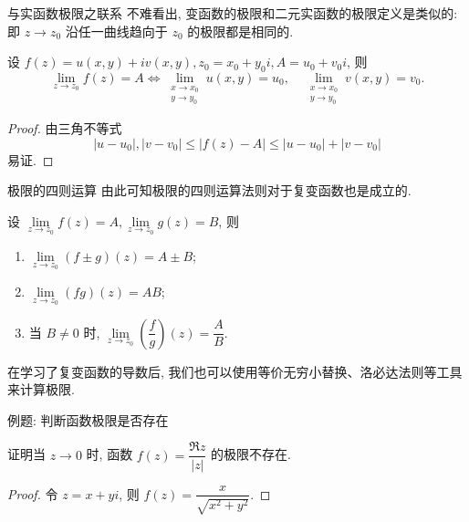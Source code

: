 \begin{frame}{与实函数极限之联系}
	\onslide<+->
	不难看出, 变函数的极限和二元实函数的极限定义是类似的:
	\onslide<+->
	即 $z\to z_0$ 沿任一曲线趋向于 $z_0$ 的极限都是相同的.

	\onslide<+->
	\begin{theorem}
		设 $f(z)=u(x,y)+iv(x,y),z_0=x_0+y_0i,A=u_0+v_0i$, 则
		\[\lim_{z\to z_0}f(z)=A\iff
		\lim_{\substack{x\to x_0\\y\to y_0}}u(x,y)=u_0,\quad
		\lim_{\substack{x\to x_0\\y\to y_0}}v(x,y)=v_0.\]
	\end{theorem}

	\onslide<+->
	\begin{proof}
		由三角不等式
		\[|u-u_0|,|v-v_0|\le|f(z)-A|\le|u-u_0|+|v-v_0|\]
		易证.
	\end{proof}
\end{frame}


\begin{frame}{极限的四则运算}
	\onslide<+->
	由此可知极限的四则运算法则对于复变函数也是成立的.

	\onslide<+->
	\begin{theorem}
		设 $\lim\limits_{z\to z_0}f(z)=A,\lim\limits_{z\to z_0}g(z)=B$, 则
		\begin{enumerate}
			\item $\lim\limits_{z\to z_0}(f\pm g)(z)=A\pm B$;
			\item $\lim\limits_{z\to z_0}(fg)(z)=AB$;
			\item 当 $B\neq 0$ 时, $\lim\limits_{z\to z_0}\left(\dfrac fg\right)(z)=\dfrac AB$.
		\end{enumerate}
	\end{theorem}

	\onslide<+->
	在学习了复变函数的导数后, 我们也可以使用等价无穷小替换、洛必达法则等工具来计算极限.
\end{frame}


\begin{frame}{例题: 判断函数极限是否存在}
	\onslide<+->
	\begin{example}
		证明当 $z\to0$ 时, 函数 $f(z)=\dfrac{\Re z}{|z|}$ 的极限不存在.
	\end{example}

	\onslide<+->
	\begin{proof}
		令 $z=x+yi$, 则 $f(z)=\dfrac x{\sqrt{x^2+y^2}}$.
		\onslide<+->{因此
			\[u(x,y)=\frac x{\sqrt{x^2+y^2}},\quad v(x,y)=0.\]}

	\end{proof}
\end{frame}


